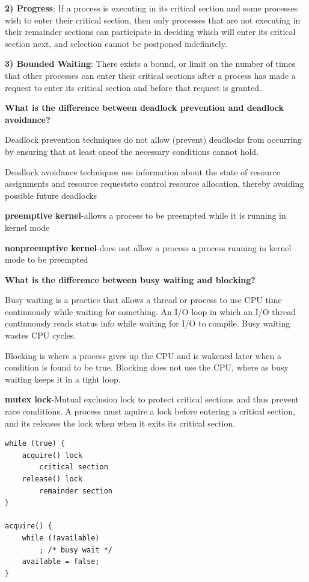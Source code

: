 \documentclass[8pt,landscape]{article}
\begin{document}
\begin{multicols}{3}
\begin{tiny}
\textbf{2) Progress}: If a process is executing in its critical section and some processes wish 
to enter their critical section, then only processes that are not executing in their remainder 
sections can participate in deciding which will enter its critical section next, and selection 
cannot be postponed indefinitely.

\textbf{3) Bounded Waiting}: There exists a bound, or limit on the number of times that other 
processes can enter their critical sections after a process has made a request to enter its 
critical section and before that request is granted.


\textbf{What is the difference between deadlock prevention and deadlock avoidance?}

Deadlock prevention techniques do not allow (prevent) deadlocks from occurring by ensuring that at least oneof the necessary conditions cannot hold.

Deadlock avoidance techniques use information about the state of resource assignments and resource requeststo control resource allocation, thereby avoiding possible future deadlocks

\textbf{preemptive kernel}-allows a process to be preempted while it is running in kernel mode

\textbf{nonpreemptive kernel}-does not allow a process a process running in kernel mode to be
preempted

\textbf{What is the difference between busy waiting and blocking?}

Busy waiting is a practice that allows a thread or process to use CPU time continuously while 
waiting for something. An I/O loop in which an I/O thread continuously reads status info while 
waiting for I/O to compile. Busy waiting wastes CPU cycles.

Blocking is where a process gives up the CPU and is wakened later when a condition is found to be 
true. Blocking does not use the CPU, where as busy waiting keeps it in a tight loop.

\textbf{mutex lock}-Mutual exclusion lock to protect critical sections and thus prevent race 
conditions. A process must aquire a lock before entering a critical section, and its releases the
lock when when it exits its critical section.

\begin{verbatim}
while (true) {
	acquire() lock
        critical section
	release() lock
        remainder section
}

acquire() {
    while (!available)
        ; /* busy wait */
    available = false;
}


\end{verbatim}
\end{tiny}
\end{multicols}
\end{document}
